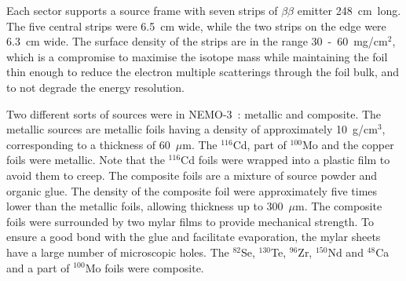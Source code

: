 \documentclass[main.tex]{subfiles}
\begin{document}
\NI Each sector supports a source frame with seven strips of $\beta\beta$ emitter 248~cm~long. The five central strips were  6.5~cm wide, while the two strips on the edge were 6.3~cm wide. The surface density of the strips are in the range 30~-~60~mg/cm$^\text{2}$, which is a compromise to maximise the isotope mass while maintaining the foil thin enough to reduce the electron multiple scatterings through the foil bulk, and to not degrade the energy resolution.


\bigskip


\NI Two different sorts of sources were in NEMO-3~: metallic and composite. The metallic sources are metallic foils having a density of approximately 10~g/cm$^\text{3}$, corresponding to a thickness of 60~$\mu$m. The $^{\text{116}}$Cd, part of $^{\text{100}}$Mo and the copper foils were metallic. Note that the $^{\text{116}}$Cd foils were wrapped into a plastic film to avoid them to creep. The composite foils are a mixture of source powder and organic glue. The density of the composite foil were approximately five times lower than the metallic foils, allowing thickness up to 300~$\mu$m. The composite foils were surrounded by two mylar films to provide mechanical strength. To ensure a good bond with the glue and facilitate evaporation, the mylar sheets have a large number of microscopic holes. The $^{\text{82}}$Se, $^{\text{130}}$Te, $^{\text{96}}$Zr, $^{\text{150}}$Nd and $^{\text{48}}$Ca and a part of $^{\text{100}}$Mo foils were composite.



\end{document}
